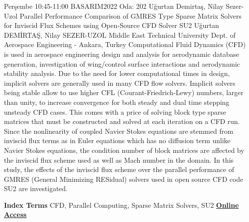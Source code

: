 
    \begin{abstract_basarim}
    {Perşembe 10:45-11:00}
    {BASARIM2022}
    {Oda: 202}
    {Uğurtan Demirtaş, Nilay Sezer-Uzol}
    {Parallel Performance Comparison of GMRES Type Sparse Matrix Solvers for Inviscid Flux Schemes using Open-Source CFD Solver SU2}
    {%
    Uğurtan DEMİRTAŞ, Nilay SEZER-UZOL}
    {%
    }
    {%
    Middle East Technical University Dept. of Aerospace Engineering - Ankara, Turkey}
    Computational Fluid Dynamics (CFD) is used in aerospace engineering design and analysis for aerodynamic database generation, investigation of wing/control surface interactions and aerodynamic stability analysis. Due to the need for lower computational times in design, implicit solvers are generally used in many CFD flow solvers. Implicit solvers being stable allow to use higher CFL (Courant-Friedrich-Lewy) numbers, larger than unity, to increase convergence for both steady and dual time stepping unsteady CFD cases. This comes with a price of solving block type sparse matrices that must be constructed and solved at each iteration on a CFD run. Since the nonlinearity of coupled Navier Stokes equations are stemmed from inviscid flux terms as in Euler equations which has no diffusion term unlike Navier Stokes equations, the condition number of block matrices are affected by the inviscid flux scheme used as well as Mach number in the domain. In this study, the effects of the inviscid flux scheme over the parallel performance of GMRES (General Minimizing RESidual) solvers used in open source CFD code SU2 are investigated. 
    
            \textbf{Index Terms} \newline{}CFD, Parallel Computing, Sparse Matrix Solvers, SU2
     \newline\newline\noindent \href{https://drive.google.com/file/d/1waCWD0mtXwaAEbE6SZlU0HiIQY5vt1f1/view?usp=drivesdk}{\bfseries Online Access}
    \end{abstract_basarim}
    